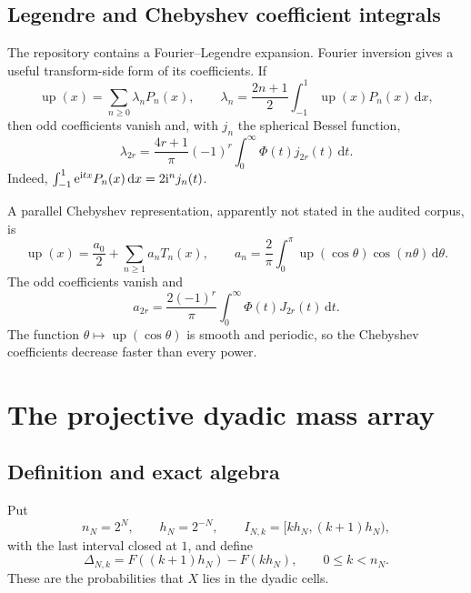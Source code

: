 \documentclass[11pt]{article}
\theoremstyle{definition}
\theoremstyle{remark}
\newcommand{\dd}{\,\mathrm d}
\newcommand{\Up}{\operatorname{up}}
\begin{document}
\subsection{Legendre and Chebyshev coefficient integrals}

The repository contains a Fourier--Legendre expansion.  Fourier inversion gives
a useful transform-side form of its coefficients.  If
\begin{equation}\label{p3:eq:Legendre-expansion}
 \Up(x)=\sum_{n\ge0}\lambda_nP_n(x),
 \qquad
 \lambda_n=\frac{2n+1}{2}\int_{-1}^1\Up(x)P_n(x)\dd x,
\end{equation}
then odd coefficients vanish and, with $j_n$ the spherical Bessel function,
\begin{equation}\label{p3:eq:Legendre-Bessel}
 \lambda_{2r}=\frac{4r+1}{\pi}(-1)^r
 \int_0^\infty\Phi(t)j_{2r}(t)\dd t.
\end{equation}
Indeed,
$\int_{-1}^1\e^{\ii tx}P_n(x)\dd x=2\ii^n j_n(t)$.

A parallel Chebyshev representation, apparently not stated in the audited
corpus, is
\begin{equation}\label{p3:eq:Chebyshev-expansion}
 \Up(x)=\frac{a_0}{2}+\sum_{n\ge1}a_nT_n(x),
 \qquad
 a_n=\frac2\pi\int_0^\pi\Up(\cos\theta)\cos(n\theta)\dd\theta.
\end{equation}
The odd coefficients vanish and
\begin{equation}\label{p3:eq:Chebyshev-Bessel}
 a_{2r}=\frac{2(-1)^r}{\pi}
 \int_0^\infty\Phi(t)J_{2r}(t)\dd t.
\end{equation}
The function $\theta\mapsto\Up(\cos\theta)$ is smooth and periodic, so the
Chebyshev coefficients decrease faster than every power.

\section{The projective dyadic mass array}
\label{p3:sec:dyadic-masses}

\subsection{Definition and exact algebra}

Put
\begin{equation}\label{p3:eq:nN-hN}
 n_N=2^N,
 \qquad h_N=2^{-N},
 \qquad I_{N,k}=[kh_N,(k+1)h_N),
\end{equation}
with the last interval closed at $1$, and define
\begin{equation}\label{p3:eq:Delta-def}
 \Delta_{N,k}
 =F((k+1)h_N)-F(kh_N),
 \qquad 0\le k<n_N.
\end{equation}
These are the probabilities that $X$ lies in the dyadic cells.
\end{document}

